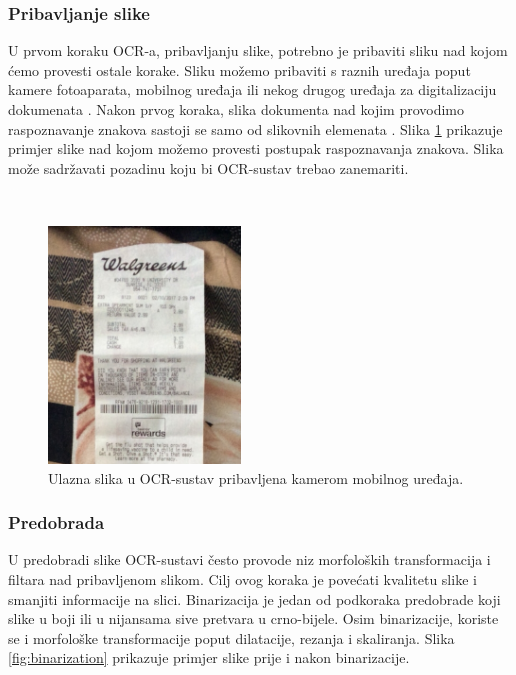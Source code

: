 \documentclass[times, utf8, zavrsni]{fer}
\begin{document}
\subsubsection{Pribavljanje slike}
U prvom koraku OCR-a, pribavljanju slike, potrebno je pribaviti sliku nad kojom
ćemo provesti ostale korake. Sliku možemo pribaviti s raznih uređaja poput
kamere fotoaparata, mobilnog uređaja ili nekog drugog uređaja za digitalizaciju
dokumenata . Nakon prvog koraka, slika dokumenta nad kojim
provodimo raspoznavanje znakova sastoji se samo od slikovnih elemenata
 \citep{Vynckier:2018:HowOcrWorks}. Slika
\ref{fig:receipt-example-02} prikazuje primjer slike nad kojom možemo provesti
postupak raspoznavanja znakova. Slika može sadržavati pozadinu koju
bi OCR-sustav trebao zanemariti.

\

\begin{figure}[htb]
    \centering
    \includegraphics[height=6.3cm]{images/receipt-example-02.jpeg}
    \caption{Ulazna slika u OCR-sustav pribavljena kamerom mobilnog uređaja.}
    \label{fig:receipt-example-02}
\end{figure}


\subsubsection{Predobrada}
U predobradi slike OCR-sustavi često provode niz morfoloških transformacija i
filtara nad pribavljenom slikom. Cilj ovog koraka je povećati kvalitetu slike i
smanjiti informacije na slici. Binarizacija je jedan od podkoraka predobrade
koji slike u boji ili u nijansama sive pretvara u crno-bijele. Osim
binarizacije, koriste se i morfološke transformacije poput dilatacije, rezanja i
skaliranja. Slika \ref{fig:binarization} prikazuje primjer slike prije i nakon
binarizacije.
\citep{Gulan:2016:Bacherlor,DBLP:journals/corr/abs-1710-05703,Jurin:2017:Master}
\end{document}

